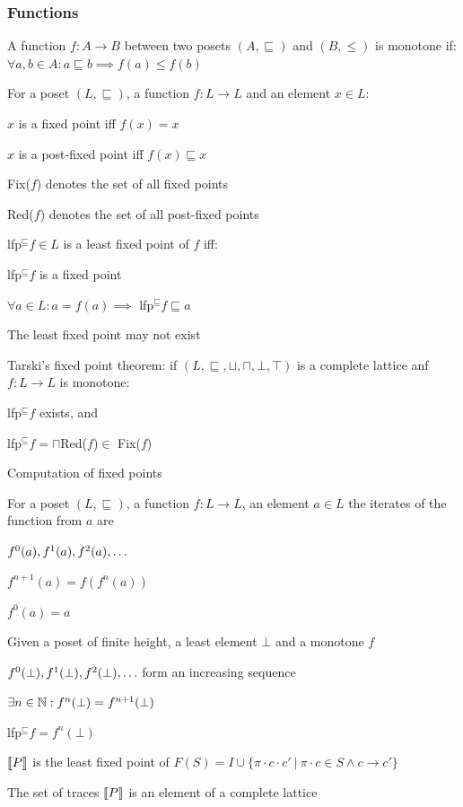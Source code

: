 \subsubsection{Functions}
\enumstart
	\item A function $f: A \rightarrow B$ between two posets $(A, \sqsubseteq)$ and $(B, \le)$ is monotone if: $\forall a,b \in A: a \sqsubseteq b \implies f(a) \le f(b)$
	\item For a poset $(L, \sqsubseteq)$, a function $f: L \rightarrow L$ and an element $x \in L$:
	\enumstart
		\item $x$ is a fixed point iff $f(x) = x$
		\item $x$ is a post-fixed point iff $f(x) \sqsubseteq x$
		\item Fix($f$) denotes the set of all fixed points
		\item Red($f$) denotes the set of all post-fixed points
		\item lfp$^\sqsubseteq f \in L$ is a least fixed point of $f$ iff:
		\enumstart
			\item lfp$^\sqsubseteq f$ is a fixed point
			\item $\forall a \in L: a = f(a) \implies$ lfp$^\sqsubseteq f \sqsubseteq a$
			\item The least fixed point may not exist
		\enumend
	\enumend
	\item Tarski's fixed point theorem: if $(L,\sqsubseteq, \sqcup, \sqcap, \bot, \top)$ is a complete lattice anf $f: L \rightarrow L$ is monotone:
	\enumstart
		\item lfp$^\sqsubseteq f$ exists, and
		\item lfp$^\sqsubseteq f = \sqcap$Red($f$)$\in$ Fix($f$) 
	\enumend
	\item Computation of fixed points
	\enumstart
		\item For a poset $(L, \sqsubseteq)$, a function $f: L \rightarrow L$, an element $a \in L$ the iterates of the function from $a$ are
		\enumstart
			\item $f^0(a), f^1(a), f^2(a), \mathellipsis$
			\item $f^{n+1}(a) = f(f^n(a))$
			\item $f^0(a) = a$
		\enumend
		\item Given a poset of finite height, a least element $\bot$ and a monotone $f$
		 \enumstart
		 	\item $f^0(\bot), f^1(\bot), f^2(\bot), \mathellipsis$ form an increasing sequence
		 	\item $\exists n \in \mathbb{N}: f^n(\bot) = f^{n+1}(\bot)$
		 	\item lfp$^\sqsubseteq f = f^n(\bot)$
		 \enumend
		 \item $\llbracket P \rrbracket$ is the least fixed point of $F(S) = I \cup \{\pi \cdotp c \cdotp c' \ | \ \pi \cdotp c \in S \land c \rightarrow c'\}$
		 \item The set of traces $\llbracket P \rrbracket$ is an element of a complete lattice
	\enumend
\enumend

